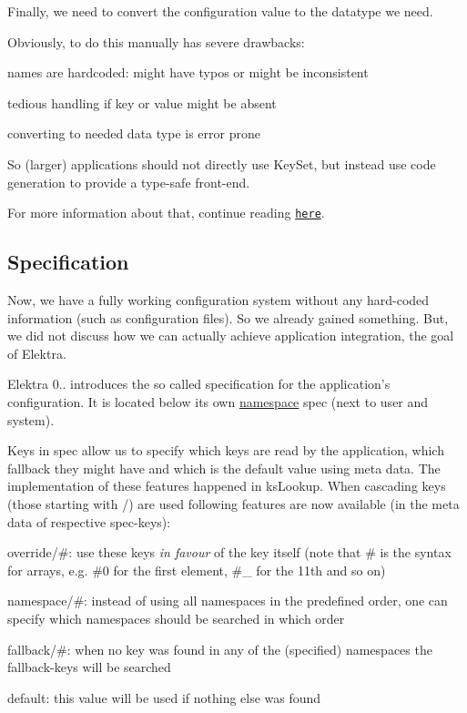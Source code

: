 Finally, we need to convert the configuration value to the datatype we need.

Obviously, to do this manually has severe drawbacks\+:


\begin{DoxyItemize}
\item names are hardcoded\+: might have typos or might be inconsistent
\item tedious handling if key or value might be absent
\item converting to needed data type is error prone
\end{DoxyItemize}

So (larger) applications should not directly use {\ttfamily Key\+Set}, but instead use code generation to provide a type-\/safe front-\/end.

For more information about that, continue reading \href{https://github.com/ElektraInitiative/libelektra/tree/master/src/tools/gen}{\tt here}.

\subsection*{Specification}

Now, we have a fully working configuration system without any hard-\/coded information (such as configuration files). So we already gained something. But, we did not discuss how we can actually achieve application integration, the goal of Elektra.

Elektra 0.. introduces the so called specification for the application's configuration. It is located below its own \hyperlink{md_doc_help_elektra-namespaces_doc_help_elektra-namespaces_md}{namespace} {\ttfamily spec} (next to user and system).

Keys in {\ttfamily spec} allow us to specify which keys are read by the application, which fallback they might have and which is the default value using meta data. The implementation of these features happened in {\ttfamily ks\+Lookup}. When cascading keys (those starting with {\ttfamily /}) are used following features are now available (in the meta data of respective {\ttfamily spec}-\/keys)\+:


\begin{DoxyItemize}
\item {\ttfamily override/\#}\+: use these keys {\itshape in favour} of the key itself (note that {\ttfamily \#} is the syntax for arrays, e.\+g. {\ttfamily \#0} for the first element, {\ttfamily \#\+\_} for the 11th and so on)
\item {\ttfamily namespace/\#}\+: instead of using all namespaces in the predefined order, one can specify which namespaces should be searched in which order
\item {\ttfamily fallback/\#}\+: when no key was found in any of the (specified) namespaces the {\ttfamily fallback}-\/keys will be searched
\item {\ttfamily default}\+: this value will be used if nothing else was found
\end{DoxyItemize}

